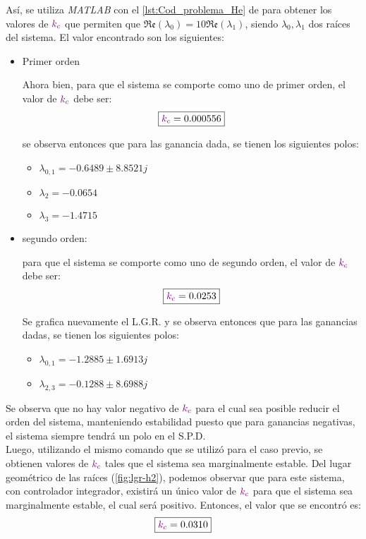 Así, se utiliza \textit{MATLAB} con el \autoref{lst:Cod_problema_He} de para obtener los valores de $\mathbin{\color{violet}k_{c}}$ que
permiten que $\mathfrak{Re}(\lambda_{0}) = 10\mathfrak{Re}(\lambda_{1})$, siendo
$\lambda_{0}, \lambda_{1}$ dos raíces del sistema.
El valor encontrado son los siguientes:
\begin{itemize}
    \item Primer orden 
    
Ahora bien, para que el sistema se comporte como uno de primer orden, el valor de
$\mathbin{\color{violet}k_{c}}$ debe ser:
\begin{equation}
    \boxed{\mathbin{\color{violet}k_{c}} = 0.000556}
\end{equation}

se observa entonces que para las ganancia dada,
se tienen los siguientes polos:
\begin{itemize}
    \item $\lambda_{0,1} = -0.6489 \pm 8.8521j$
    \item $\lambda_{2} = -0.0654 $
    \item $\lambda_{3} = -1.4715  $
\end{itemize}

    \item segundo orden:
    
    para que el sistema se comporte como uno de segundo orden, el valor de
$\mathbin{\color{violet}k_{c}}$ debe ser:
\begin{equation}
    \boxed{\mathbin{\color{violet}k_{c}} = 0.0253}
\end{equation}

Se grafica nuevamente el L.G.R. y se observa entonces que para las ganancias dadas,
se tienen los siguientes polos:
\begin{itemize}
    \item $\lambda_{0,1} = -1.2885 \pm 1.6913j$
    \item $\lambda_{2,3} = -0.1288 \pm 8.6988j$
\end{itemize}
\end{itemize}



Se observa que no hay valor negativo de $\mathbin{\color{violet}k_{c}}$ para el cual sea posible
reducir el orden del sistema, manteniendo estabilidad puesto que para ganancias
negativas, el sistema siempre tendrá un polo en el S.P.D. \\

Luego, utilizando el mismo comando que se utilizó para el caso previo, se obtienen
valores de $\mathbin{\color{violet}k_{c}}$ tales que el sistema sea marginalmente estable. Del lugar
geométrico de las raíces (\autoref{fig:lgr-h2}), podemos observar que para este sistema,
con controlador integrador, existirá un único valor de $\mathbin{\color{violet}k_{c}}$ para que
el sistema sea marginalmente estable, el cual será positivo. Entonces, el valor
que se encontró es:
\begin{equation}
    \boxed{\mathbin{\color{violet}k_{c}} = 0.0310}
\end{equation}

